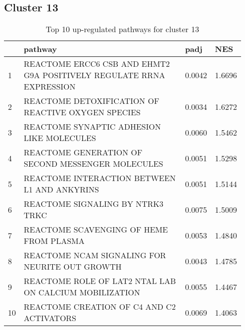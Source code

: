 \documentclass{article}
\begin{document}
\subsection{Cluster 13 }
\begin{table}[H]
\centering
\begin{tabular}{p{0.05\linewidth}p{0.7\linewidth}p{0.1\linewidth}p{0.1\linewidth}}
  \hline
 & pathway & padj & NES \\ 
  \hline
1 & REACTOME ERCC6 CSB AND EHMT2 G9A POSITIVELY REGULATE RRNA EXPRESSION & 0.0042 & 1.6696 \\ 
  2 & REACTOME DETOXIFICATION OF REACTIVE OXYGEN SPECIES & 0.0034 & 1.6272 \\ 
  3 & REACTOME SYNAPTIC ADHESION LIKE MOLECULES & 0.0060 & 1.5462 \\ 
  4 & REACTOME GENERATION OF SECOND MESSENGER MOLECULES & 0.0051 & 1.5298 \\ 
  5 & REACTOME INTERACTION BETWEEN L1 AND ANKYRINS & 0.0051 & 1.5144 \\ 
  6 & REACTOME SIGNALING BY NTRK3 TRKC & 0.0075 & 1.5009 \\ 
  7 & REACTOME SCAVENGING OF HEME FROM PLASMA & 0.0053 & 1.4840 \\ 
  8 & REACTOME NCAM SIGNALING FOR NEURITE OUT GROWTH & 0.0043 & 1.4785 \\ 
  9 & REACTOME ROLE OF LAT2 NTAL LAB ON CALCIUM MOBILIZATION & 0.0055 & 1.4467 \\ 
  10 & REACTOME CREATION OF C4 AND C2 ACTIVATORS & 0.0069 & 1.4063 \\ 
   \hline
\end{tabular}
\caption{Top 10 up-regulated pathways for cluster 13} 
\label{tab:q3_2_13}
\end{table}
\end{document}
